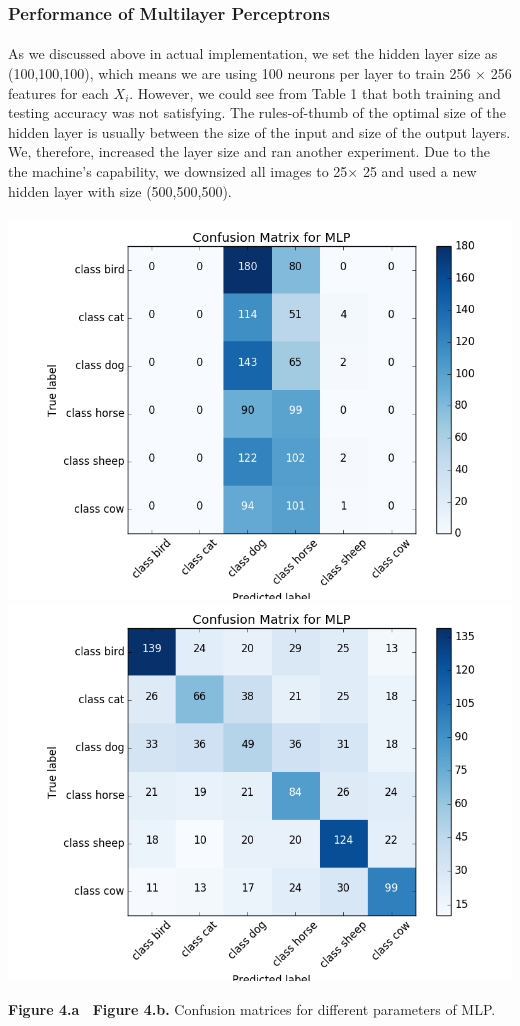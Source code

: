 \documentclass{article}
\begin{document}
\subsubsection{Performance of Multilayer Perceptrons}
\paragraph{}
As we discussed above in actual implementation, we set the hidden layer size as (100,100,100), which means we are using 100 neurons per layer to train 256 $\times$ 256 features for each  $X_i$. However, we could see from Table 1 that both training and testing accuracy was not satisfying. The rules-of-thumb of the optimal size of the hidden layer is usually between the size of the input and size of the output layers. We, therefore, increased the layer size and ran another experiment. Due to the the machine's capability, we downsized all images to 25$ \times $ 25 and used a new hidden layer with size (500,500,500).\\\\
\includegraphics[scale=0.38]{MLP_cm.png}
\includegraphics[scale=0.38]{MLP_cm_new1.png}
\begin{center}

\textbf{ Figure 4.a \ Figure 4.b.} Confusion matrices for different parameters of MLP. 
\end{center}
\end{document}
